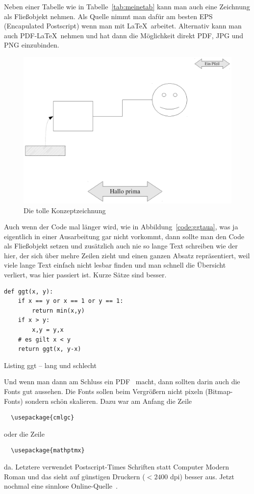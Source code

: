 \documentclass[11pt,a4paper]{article} %
\begin{document}
Neben einer Tabelle wie in Tabelle~\ref{tab:meinetab} kann man 
auch eine Zeichnung als Fließobjekt nehmen.
Als Quelle nimmt man dafür am besten 
EPS (Encapulated Postscript\cite{postscript}) wenn
man mit \LaTeX\ arbeitet.
Alternativ kann man auch PDF-\LaTeX\ nehmen und
hat dann die Möglichkeit direkt PDF, JPG und PNG einzubinden.

\begin{figure}[htp]
\centering
\includegraphics[width=.9\textwidth]{zeichnung.pdf}
\caption{Die tolle Konzeptzeichnung}
\label{fig:tk}
\end{figure}

Auch wenn der Code mal länger wird, wie in Abbildung~\ref{code:ggtaua}, 
was ja eigentlich in einer Ausarbeitung gar nicht vorkommt, 
dann sollte man den Code als Fließobjekt setzen und 
zusätzlich auch nie so lange Text schreiben wie der hier, der sich 
über mehre Zeilen zieht und einen ganzen Absatz repräsentiert, 
weil viele lange Text einfach nicht lesbar finden und man schnell
die Übersicht verliert, was hier passiert ist.
Kurze Sätze sind besser. 

\begin{listing}[ht]
\begin{lstlisting}
def ggt(x, y):
	if x == y or x == 1 or y == 1:
		return min(x,y)
	if x > y:
		x,y = y,x
	# es gilt x < y
	return ggt(x, y-x)
\end{lstlisting}
\caption{Listing ggt -- lang und schlecht}
\label{code:ggtaua}
\end{listing}

\Blindtext[2]

Und wenn man dann am Schluss ein PDF~\cite{pdf} macht, dann
sollten darin auch die Fonts gut aussehen. 
Die Fonts sollen beim Vergrößern nicht pixeln (Bitmap-Fonts) sondern
schön skalieren. 
Dazu war am Anfang die Zeile 
\begin{verbatim}
  \usepackage{cmlgc}
\end{verbatim}
oder die Zeile
\begin{verbatim}
  \usepackage{mathptmx}
\end{verbatim}
da.
Letztere verwendet Postscript-Times Schriften statt Computer Modern Roman
und das sieht auf günstigen Druckern ($< 2400$ dpi) besser aus.
Jetzt nochmal eine sinnlose Online-Quelle~\cite{wikipediaciting}.
\end{document}
